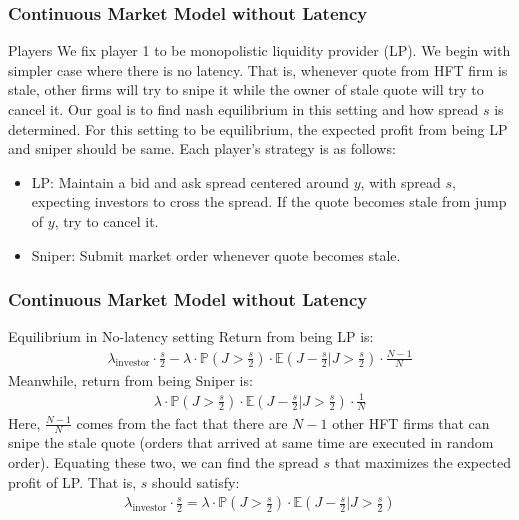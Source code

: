 \documentclass{beamer}
\begin{document}
\begin{frame}
    \frametitle{Continuous Market Model without Latency} 
    \begin{block}{Players}
        We fix player 1 to be monopolistic liquidity provider (LP). We begin with simpler case where there is no latency. That is, whenever quote from HFT firm is stale, other firms will try to snipe it while the owner of stale quote will try to cancel it. Our goal is to find nash equilibrium in this setting and how spread $s$ is determined. For this setting to be equilibrium, the expected profit from being LP and sniper should be same. Each player's strategy is as follows:
        \begin{itemize}
            \item LP: Maintain a bid and ask spread centered around $y$, with spread $s$, expecting investors to cross the spread. If the quote becomes stale from jump of $y$, try to cancel it.
            \item Sniper: Submit market order whenever quote becomes stale.
        \end{itemize}
    \end{block}
\end{frame}

\begin{frame}
    \frametitle{Continuous Market Model without Latency}
    \begin{block}{Equilibrium in No-latency setting}
        Return from being LP is: 
        \begin{align}
            \lambda_\text{investor} \cdot \frac{s}{2} - \lambda \cdot \mathbb{P}(J > \frac{s}{2}) \cdot \mathbb{E}(J - \frac{s}{2} | J > \frac{s}{2}) \cdot \frac{N-1}{N}
        \end{align}
        Meanwhile, return from being Sniper is: 
        \begin{align}
            \lambda \cdot \mathbb{P}(J > \frac{s}{2}) \cdot \mathbb{E}(J - \frac{s}{2} | J > \frac{s}{2}) \cdot \frac{1}{N}
        \end{align}
        Here, $\frac{N-1}{N}$ comes from the fact that there are $N-1$ other HFT firms that can snipe the stale quote (orders that arrived at same time are executed in random order). Equating these two, we can find the spread $s$ that maximizes the expected profit of LP. That is, $s$ should satisfy: \begin{align}
            \lambda_\text{investor} \cdot \frac{s}{2} = \lambda \cdot \mathbb{P}(J > \frac{s}{2}) \cdot \mathbb{E}(J - \frac{s}{2} | J > \frac{s}{2})
        \end{align}
    \end{block}
\end{frame}
\end{document}
